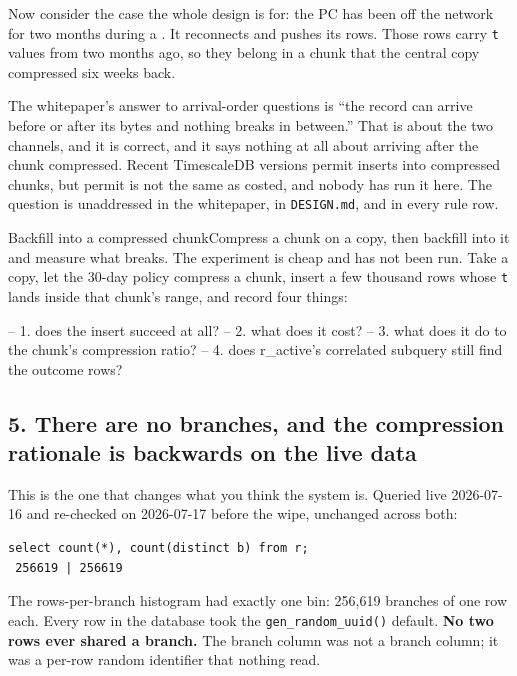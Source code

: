 Now consider the case the whole design is for: the \labColdSystemShort PC has been off the network for two months during a \labRun. It reconnects and pushes its rows. Those rows carry \texttt{t} values from two months ago, so they belong in a chunk that the central copy compressed six weeks back.

The whitepaper's answer to arrival-order questions is ``the record can arrive before or after its bytes and nothing breaks in between.'' That is about the two channels, and it is correct, and it says nothing at all about arriving after the chunk compressed. Recent TimescaleDB versions permit inserts into compressed chunks, but permit is not the same as costed, and nobody has run it here. The question is unaddressed in the whitepaper, in \texttt{DESIGN.md}, and in every rule row.

\begin{Open}{Backfill into a compressed chunk}{Compress a chunk on a copy, then backfill into it and measure what breaks.}
The experiment is cheap and has not been run. Take a copy, let the 30-day policy compress a chunk, insert a few thousand rows whose \texttt{t} lands inside that chunk's range, and record four things:

\begin{Check}
-- 1. does the insert succeed at all?
-- 2. what does it cost?
-- 3. what does it do to the chunk's compression ratio?
-- 4. does r_active's correlated subquery still find the outcome rows?
\end{Check}
\end{Open}

\subsection{5. There are no branches, and the compression rationale is backwards on the live data}

This is the one that changes what you think the system is. Queried live 2026-07-16 and re-checked on 2026-07-17 before the wipe, unchanged across both:

\begin{verbatim}
select count(*), count(distinct b) from r;
 256619 | 256619
\end{verbatim}

The rows-per-branch histogram had exactly one bin: 256,619 branches of one row each. Every row in the database took the \texttt{gen\_random\_uuid()} default. \textbf{No two rows ever shared a branch.} The branch column was not a branch column; it was a per-row random identifier that nothing read.

